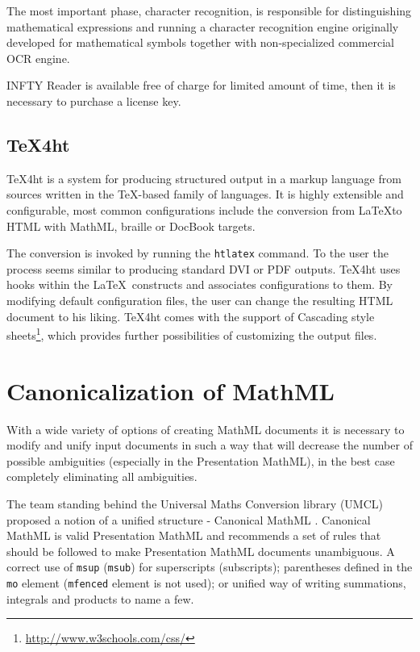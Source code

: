 \documentclass[11pt,oneside,final]{fithesis2}
\begin{document}
The most important phase, character recognition, is responsible for distinguishing mathematical expressions and running a character recognition engine originally developed for mathematical symbols together with non-specialized commercial OCR engine. 

INFTY Reader is available free of charge for limited amount of time, then it is necessary to purchase a license key.

\subsection{\TeX 4ht}
\TeX 4ht \cite{tex4ht:gurari2004} is a system for producing structured output in a markup language from sources written in the \TeX -based family of languages. It is highly extensible and configurable, most common configurations include the conversion from \LaTeX to HTML with MathML, braille or DocBook targets.

The conversion is invoked by running the \texttt{htlatex} command. To the user the process seems similar to producing standard DVI or PDF outputs. \TeX 4ht uses hooks within the \LaTeX\ constructs and associates configurations to them. By modifying default configuration files, the user can change the resulting HTML document to his liking. \TeX 4ht comes with the support of Cascading style sheets\footnote{\url{http://www.w3schools.com/css/}}, which provides further possibilities of customizing the output files. 

\section{Canonicalization of MathML}
With a wide variety of options of creating MathML documents it is necessary to modify and unify input documents in such a way that will decrease the number of possible ambiguities (especially in the Presentation MathML), in the best case completely eliminating all ambiguities. 

The team standing behind the Universal Maths Conversion library (UMCL) \cite{umcl:archambault2004towards} proposed a notion of a unified structure - Canonical MathML \cite{umcl:archambault2006canonical}. Canonical MathML is valid Presentation MathML and recommends a set of rules that should be followed to make Presentation MathML documents unambiguous. A correct use of \texttt{msup} (\texttt{msub}) for superscripts (subscripts); parentheses defined in the \texttt{mo} element (\texttt{mfenced} element is not used); or unified way of writing summations, integrals and products to name a few. 
\end{document}
